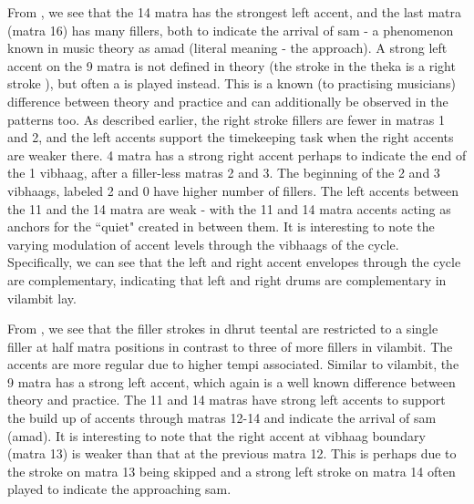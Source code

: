 \begin{description}[style=unboxed,leftmargin=0cm]
\item[\textbf{\Gls{vilambit} \gls{teental}}:] From , we see that the 14 matra has the strongest left accent, and the last \gls{matra} (matra 16) has many fillers, both to indicate the arrival of \gls{sam} - a phenomenon known in music theory as \gls{amad} (literal meaning - the approach). A strong left accent on the 9 matra is not defined in theory (the stroke in the \gls{theka} is a right stroke ), but often a  is played instead. This is a known (to practising musicians) difference between theory and practice and can additionally be observed in the patterns too. As described earlier, the right stroke fillers are fewer in \glspl{matra} 1 and 2, and the left accents support the timekeeping task when the right accents are weaker there. 4 \gls{matra} has a strong right accent perhaps to indicate the end of the 1 \gls{vibhaag}, after a filler-less \glspl{matra} 2 and 3. The beginning of the 2 and 3 \glspl{vibhaag}, labeled 2 and 0 have higher number of fillers. The left accents between the 11 and the 14 matra are weak - with the 11 and 14 \gls{matra} accents acting as anchors for the ``quiet" created in between them. It is interesting to note the varying modulation of accent levels through the \glspl{vibhaag} of the cycle. Specifically, we can see that the left and right accent envelopes through the cycle are complementary, indicating that left and right drums are complementary in \gls{vilambit} \gls{lay}. %
%
\item[\textbf{\Gls{madhyam} and \gls{dhrut} \gls{lay} \gls{teental}}:] From , we see that the filler strokes in \gls{dhrut} \gls{teental} are restricted to a single filler at half \gls{matra} positions in contrast to three of more fillers in \gls{vilambit}. The accents are more regular due to higher tempi associated. Similar to \gls{vilambit}, the 9 matra has a strong left accent, which again is a well known difference between theory and practice. The 11 and 14 \glspl{matra} have strong left accents to support the build up of accents through \glspl{matra} 12-14 and indicate the arrival of sam (\gls{amad}). It is interesting to note that the right accent at \gls{vibhaag} boundary (\gls{matra} 13) is weaker than that at the previous \gls{matra} 12. This is perhaps due to the stroke on \gls{matra} 13 being skipped and a strong left stroke on \gls{matra} 14 often played to indicate the approaching \gls{sam}. 

\end{description}
